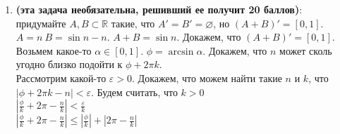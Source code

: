 \documentclass[a4paper]{article}
\def\eps{\varepsilon}
\begin{document}
\begin{enumerate}
    \item \textbf{(эта задача необязательна, решивший ее получит 20 баллов)}: придумайте $A,B\subset \mathbb R$ такие, что $A' = B' = \varnothing$, но $(A+B)' = [0,1]$.\\
    $A = n\ B = \sin n - n$. $A + B = \sin n$. Докажем, что $(A + B)' = [0, 1]$. Возьмем какое-то $\alpha \in [0, 1]$. $\phi = \arcsin \alpha$. Докажем, что $n$ может сколь угодно близко подойти к $\phi + 2\pi k$.\\
    Рассмотрим какой-то $\eps > 0$. Докажем, что можем найти такие $n$ и $k$, что $|\phi + 2\pi k - n| < \eps$. Будем считать, что $k > 0$\\
    $|\frac{\phi}{k} + 2\pi - \frac{n}{k}| < \frac{\eps}{k}$\\
    $|\frac{\phi}{k} + 2\pi - \frac{n}{k}| \le |\frac{\phi}{k}| + |2\pi - \frac{n}{k}|$
\end{enumerate}
\end{document}
